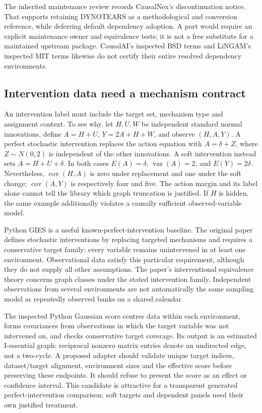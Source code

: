 The inherited maintenance review records CausalNex's discontinuation notice.
That supports retaining DYNOTEARS as a methodological and conversion
reference, while deferring default dependency adoption. A port would require
an explicit maintenance owner and equivalence tests; it is not a free
substitute for a maintained upstream package. CausalAI's inspected BSD terms
and LiNGAM's inspected MIT terms likewise do not certify their entire
resolved dependency environments. \citep{exec14_causalnex_primary,
exec14_pt_causalai,exec13_pydisc_lingam,exec14_pt_contract}

\subsection{Intervention data need a mechanism contract}

An intervention label must include the target set, mechanism type and
assignment context. To see why, let $H,U,W$ be independent standard
normal innovations, define $A=H+U$, $Y=2A+H+W$, and observe $(H,A,Y)$.
A perfect stochastic
intervention replaces the action equation with $A=\delta+Z$, where
$Z\sim N(0,2)$ is independent of the other innovations. A soft intervention
instead sets $A=H+U+\delta$. In both cases $E(A)=\delta$,
$\operatorname{var}(A)=2$, and $E(Y)=2\delta$. Nevertheless,
$\operatorname{cov}(H,A)$ is zero under replacement and one under the soft
change; $\operatorname{cov}(A,Y)$ is respectively four and five. The action
margin and its label alone cannot tell the library which graph truncation
is justified. If $H$ is hidden, the same example additionally violates a
causally sufficient observed-variable model. \citep{exec14_pt_exact}

Python GIES is a useful known-perfect-intervention baseline. The original
paper defines stochastic interventions by replacing targeted mechanisms
and requires a conservative target family: every variable remains
unintervened in at least one environment. Observational data satisfy this
particular requirement, although they do not supply all other assumptions.
The paper's interventional equivalence theory concerns graph classes under
the stated intervention family. Independent observations from several
environments are not automatically the same sampling model as repeatedly
observed banks on a shared calendar. \citep{exec14_pt_paper_gies}

The inspected Python Gaussian score centres data within each environment,
forms covariances from observations in which the target variable was not
intervened on, and checks conservative target coverage. Its output is an
estimated I-essential graph: reciprocal nonzero matrix entries denote an
undirected edge, not a two-cycle. A proposed adapter should validate unique
target indices, dataset/target alignment, environment sizes and the
effective score before preserving these endpoints. It should refuse to
present the score as an effect or confidence interval. This candidate is
attractive for a transparent generated perfect-intervention comparison;
soft targets and dependent panels need their own justified treatment.
\citep{exec14_pt_gies,exec14_pt_contract}

